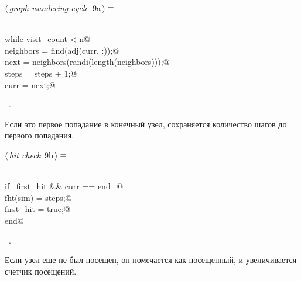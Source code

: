 \documentclass{article}
\begin{document}
\begin{flushleft} \small
\begin{minipage}{\linewidth}\label{scrap6}\raggedright\small
{} $\langle\,${\itshape graph wandering cycle}\nobreak\ {\footnotesize {9a}}$\,\rangle\equiv$
\vspace{-1ex}
\begin{list}{}{} \item
\mbox{}\verb@@\\
\mbox{}\verb@        while visit_count < n@\\
\mbox{}\verb@            neighbors = find(adj(curr, :));@\\
\mbox{}\verb@            next = neighbors(randi(length(neighbors)));@\\
\mbox{}\verb@            steps = steps + 1;@\\
\mbox{}\verb@            curr = next;@\\
\mbox{}\verb@@{\NWsep}
\end{list}
\vspace{-1.5ex}
\footnotesize
\begin{list}{}{\setlength{\itemsep}{-\parsep}\setlength{\itemindent}{-\leftmargin}}
\item \NWtxtMacroRefIn\ .

\item{}
\end{list}
\end{minipage}\vspace{4ex}
\end{flushleft}
Если это первое попадание в конечный узел, сохраняется количество шагов до первого попадания.

\begin{flushleft} \small
\begin{minipage}{\linewidth}\label{scrap7}\raggedright\small
{} $\langle\,${\itshape hit check}\nobreak\ {\footnotesize {9b}}$\,\rangle\equiv$
\vspace{-1ex}
\begin{list}{}{} \item
\mbox{}\verb@@\\
\mbox{}\verb@            if ~first_hit && curr == end_@\\
\mbox{}\verb@                fht(sim) = steps;@\\
\mbox{}\verb@                first_hit = true;@\\
\mbox{}\verb@            end@\\
\mbox{}\verb@@{\NWsep}
\end{list}
\vspace{-1.5ex}
\footnotesize
\begin{list}{}{\setlength{\itemsep}{-\parsep}\setlength{\itemindent}{-\leftmargin}}
\item \NWtxtMacroRefIn\ .

\item{}
\end{list}
\end{minipage}\vspace{4ex}
\end{flushleft}
Если узел еще не был посещен, он помечается как посещенный, и увеличивается счетчик посещений.
\end{document}
